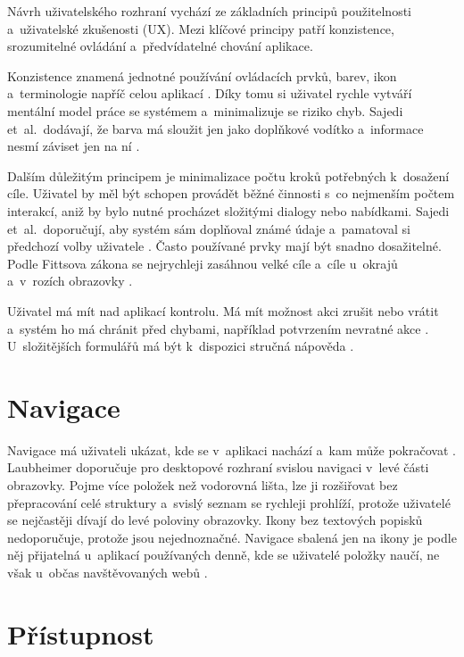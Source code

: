Návrh uživatelského rozhraní vychází ze základních principů použitelnosti a~uživatelské zkušenosti (UX). Mezi klíčové principy patří konzistence, srozumitelné ovládání a~předvídatelné chování aplikace.

Konzistence znamená jednotné používání ovládacích prvků, barev, ikon a~terminologie napříč celou aplikací \cite{Nielsen-heuristiky}. Díky tomu si uživatel rychle vytváří mentální model práce se systémem a~minimalizuje se riziko chyb. Sajedi et~al.\ dodávají, že barva má sloužit jen jako doplňkové vodítko a~informace nesmí záviset jen na ní \cite[s.~2329]{Sajedi2011}.

Dalším důležitým principem je minimalizace počtu kroků potřebných k~dosažení cíle. Uživatel by měl být schopen provádět běžné činnosti s~co nejmenším počtem interakcí, aniž by bylo nutné procházet složitými dialogy nebo nabídkami. Sajedi et~al.\ doporučují, aby systém sám doplňoval známé údaje a~pamatoval si předchozí volby uživatele \cite[s.~2331--2332]{Sajedi2011}. Často používané prvky mají být snadno dosažitelné. Podle Fittsova zákona se nejrychleji zasáhnou velké cíle a~cíle u~okrajů a~v~rozích obrazovky \cite[s.~2330]{Sajedi2011}.

Uživatel má mít nad aplikací kontrolu. Má mít možnost akci zrušit nebo vrátit a~systém ho má chránit před chybami, například potvrzením nevratné akce \cite[s.~2331--2332]{Sajedi2011}. U~složitějších formulářů má být k~dispozici stručná nápověda \cite[s.~2330]{Sajedi2011}.

\section{Navigace}\label{sec:ui-navigace}

Navigace má uživateli ukázat, kde se v~aplikaci nachází a~kam může pokračovat \cite[s.~2332--2333]{Sajedi2011}. Laubheimer doporučuje pro desktopové rozhraní svislou navigaci v~levé části obrazovky. Pojme více položek než vodorovná lišta, lze ji rozšiřovat bez přepracování celé struktury a~svislý seznam se rychleji prohlíží, protože uživatelé se nejčastěji dívají do levé poloviny obrazovky. Ikony bez textových popisků nedoporučuje, protože jsou nejednoznačné. Navigace sbalená jen na ikony je podle něj přijatelná u~aplikací používaných denně, kde se uživatelé položky naučí, ne však u~občas navštěvovaných webů \cite{Laubheimer2021}.

\section{Přístupnost}\label{sec:ui-pristupnost}

